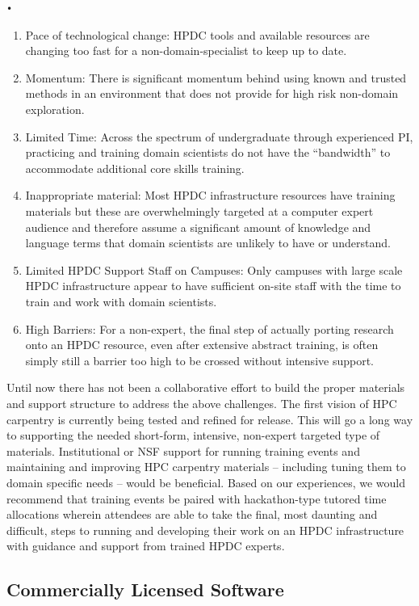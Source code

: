 \texttt{•}\documentclass[10pt,letterpaper,draft]{article}
\begin{document}
\begin{enumerate}
    \item Pace of technological change: HPDC tools and available resources are changing too fast for a non-domain-specialist to keep up to date.
    \item Momentum:  There is significant momentum behind using known and trusted methods in an environment that does not provide for high risk non-domain exploration.
    \item Limited Time:  Across the spectrum of undergraduate through experienced PI, practicing and training domain scientists do not have the ``bandwidth'' to accommodate additional core skills training.
    \item Inappropriate material: Most HPDC infrastructure resources have training materials but these are overwhelmingly targeted at a computer expert audience and therefore assume a significant amount of knowledge and language terms that domain scientists are unlikely to have or understand.
    \item Limited HPDC Support Staff on Campuses: Only campuses with large scale HPDC infrastructure appear to have sufficient on-site staff with the time to train and work with domain scientists. 
    \item High Barriers: For a non-expert, the final step of actually porting research onto an HPDC resource, even after extensive abstract training, is often simply still a barrier too high to be crossed without intensive support.

\end{enumerate}
Until now there has not been a collaborative effort to build the proper materials and support structure to address the above challenges. The first vision of HPC carpentry is currently being tested and refined for release. This will go a long way to supporting the needed short-form, intensive, non-expert targeted type of materials. Institutional or NSF support for running training events and maintaining and improving HPC carpentry materials -- including tuning them to domain specific needs -- would be beneficial. Based on our experiences, we would recommend that training events be paired with hackathon-type tutored time allocations wherein attendees are able to take the final, most daunting and difficult, steps to running and developing their work on an HPDC infrastructure with guidance and support from trained HPDC experts.

\subsection*{Commercially Licensed Software}
\end{document}
